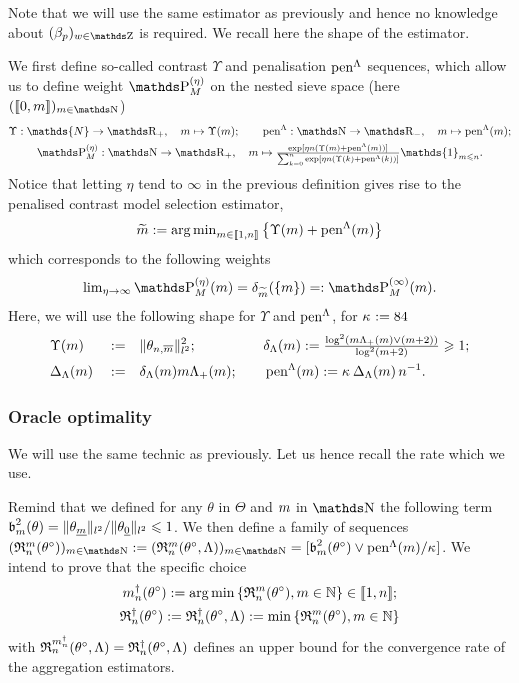 Note that we will use the same estimator as previously and hence no knowledge about $(\beta_{p})_{w \in \Z}$ is required.
We recall here the shape of the estimator.
\begin{de*}
We first define so-called contrast $\Upsilon$ and penalisation $\pen^{\Lambda}$ sequences, which allow us to define weight $\P_{M}^{(\eta)}$ on the nested sieve space (here $(\llbracket 0, m \rrbracket)_{m \in \N}$)
\begin{multline*}
\Upsilon : \mathds{N} \to \R_{+}, \quad m \mapsto \Upsilon(m); \qquad \pen^{\Lambda} : \N \to \R_{-}, \quad m \mapsto \pen^{\Lambda}(m);\\
\P_{M}^{(\eta)} : \N \to \R_{+}, \quad m \mapsto \tfrac{\exp[\eta n (\Upsilon(m) + \pen^{\Lambda}(m))]}{\sum\nolimits_{k = 0}^{n} \exp[\eta n (\Upsilon(k) + \pen^{\Lambda}(k))]} \mathds{1}_{m \leq n}.
\end{multline*}
Notice that letting $\eta$ tend to $\infty$ in the previous definition gives rise to the penalised contrast model selection estimator,
\begin{equation*}
  \tDi:=\argmin\nolimits_{\Di\in\nset{1,\ssY}} \big\{\Upsilon(m) + \penSv\big\}
\end{equation*}
which corresponds to the following weights
\begin{equation*}
  \lim\nolimits_{\rWc\to\infty}\rWe=\dirac[\tDi](\{\Di\})=:\msWe.
\end{equation*}
Here, we will use the following shape for $\Upsilon$ and $\pen^{\Lambda}$, for $\cpen := 84$
\begin{alignat*}{4}
  & \Upsilon(m) && := && \Vert \theta_{n, \overline{m}} \Vert_{l^{2}}^{2};  \quad && \cmiSv := \tfrac{\log^{2}(\Di\miSv \vee(\Di+2))}{\log^{2}(\Di+2)}\geq1;\\
  & \DipenSv && := && \cmiSv \Di \miSv; \quad && \penSv:= \penD.
  \end{alignat*}
  \assEnd
\end{de*}

\subsubsection{Oracle optimality}
We will use the same technic as previously.
Let us hence recall the rate which we use.
\begin{de*}
Remind that we defined for any $\theta$ in $\Theta$ and $\Di$ in $\N$ the following term $\b_{m}^{2}(\theta) = \Vert \theta_{\underline{m}} \Vert_{l^{2}}/\Vert \theta_{\underline{0}} \Vert_{l^{2}} \leq 1$.
We then define a family of sequences $(\daRa{\Di}{(\xdf)})_{\Di \in \N} := (\daRa{\Di}{(\xdf,\Lambda)})_{\Di \in \N} = [\b_{m}^{2}(\theta^{\circ}) \vee \penSv/\cpen]$.
We intend to prove that the specific choice
\begin{multline*}
\aDi{\ssY}(\xdf):=\argmin\Nset[\Di\in\Nz]{\daRa{\Di}{(\xdf)}}\in\nset{1,\ssY}; \\
\naRa{(\xdf)}:=\naRa{(\xdf,\Lambda)}:=\min\Nset[\Di\in\Nz]{\daRa{\Di}{(\xdf)}}
\end{multline*}
with $\daRa{\aDi{\ssY}}{(\xdf,\Lambda)}=\naRa{(\xdf,\Lambda)}$ defines an upper bound for the convergence rate of the aggregation estimators.
\assEnd
\end{de*}

